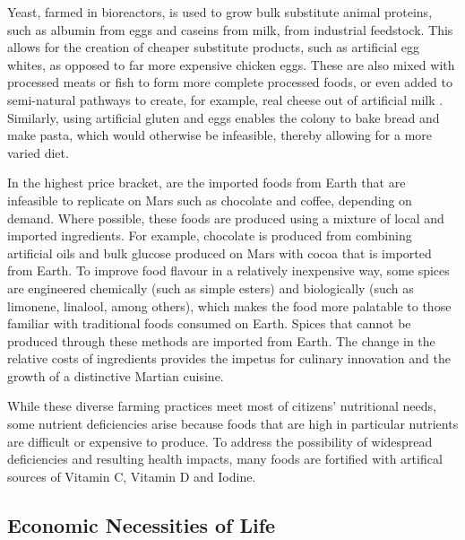\documentclass[fleqn,10pt]{Stylesheet} %
\begin{document}
Yeast, farmed in bioreactors, is used to grow bulk substitute animal proteins, such as albumin from eggs and caseins from milk, from industrial feedstock. This allows for the creation of cheaper substitute products, such as artificial egg whites, as opposed to far more expensive chicken eggs. These are also mixed with processed meats or fish to form more complete processed foods, or even added to semi-natural pathways to create, for example, real cheese out of artificial milk \cite{Pandya2017}. Similarly, using artificial gluten and eggs enables the colony to bake bread and make pasta, which would otherwise be infeasible, thereby allowing for a more varied diet.

In the highest price bracket, are the imported foods from Earth that are infeasible to replicate on Mars such as chocolate and coffee, depending on demand. Where possible, these foods are produced using a mixture of local and imported ingredients. For example, chocolate is produced from combining artificial oils and bulk glucose produced on Mars with cocoa that is imported from Earth. To improve food flavour in a relatively inexpensive way, some spices are engineered chemically (such as simple esters) and biologically (such as limonene, linalool, among others), which makes the food more palatable to those familiar with traditional foods consumed on Earth. Spices that cannot be produced through these methods are imported from Earth. The change in the relative costs of ingredients provides the impetus for culinary innovation and the growth of a distinctive Martian cuisine.

While these diverse farming practices meet most of citizens' nutritional needs, some nutrient deficiencies arise because foods that are high in particular nutrients are difficult or expensive to produce. To address the possibility of widespread deficiencies and resulting health impacts, many foods are fortified with artifical sources of Vitamin C, Vitamin D and Iodine.



\subsection{Economic Necessities of Life}
\end{document}
